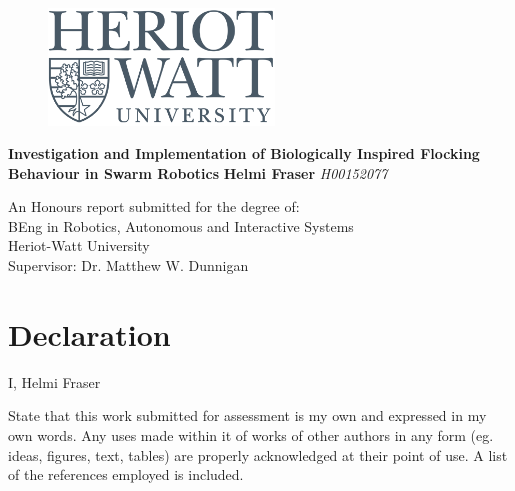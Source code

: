 \documentclass[a4paper,12pt]{report}
\begin{document}


\cfoot{\thepage}



\thispagestyle{empty}

\begin{figure}
	\centering
	\includegraphics[width=6cm]{HW_logo}
\end{figure}	
\vskip40mm
\begin{center}
\huge\textbf{Investigation and Implementation of Biologically Inspired Flocking Behaviour in Swarm Robotics}
\vskip7mm
\Large\textbf{Helmi Fraser}
\vskip1mm
\Large\textit{H00152077}
\normalsize
\end{center}
\vfill
\begin{flushleft}
\large
An Honours report submitted for the degree of:\\
BEng in Robotics, Autonomous and Interactive Systems \\
Heriot-Watt University	\\
Supervisor: Dr. Matthew W. Dunnigan
\end{flushleft}		


\chapter*{Declaration}
I, Helmi Fraser

State that this work submitted for assessment is my own and expressed in my own words. Any uses made within it of works of other authors in any form (eg. ideas, figures, text, tables) are properly acknowledged at their point of use. A list of the references employed is included.
\end{document}
